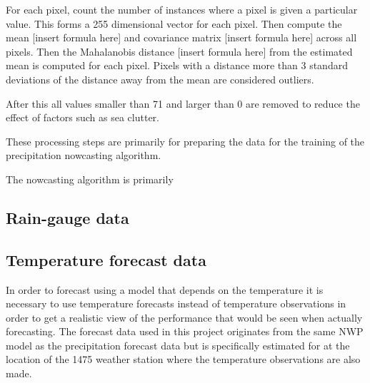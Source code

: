 For each pixel, count the number of instances where a pixel is given a particular value. This forms a 255 dimensional vector for each  pixel. Then compute the mean [insert formula here] and covariance matrix [insert formula here] across all pixels. Then the Mahalanobis distance [insert formula here] from the estimated mean is computed for each pixel. Pixels with a distance more than 3 standard deviations of the distance away from the mean are considered outliers. 

After this all values smaller than 71 and larger than 0 are removed to reduce the effect of factors such as sea clutter.

These processing steps are primarily for preparing the data for the training of the precipitation nowcasting algorithm. 

The nowcasting algorithm is primarily 






\subsection{Rain-gauge data}

\subsection{Temperature forecast data}
In order to forecast using a model that depends on the temperature it is necessary to use temperature forecasts instead of temperature observations in order to get a realistic view of the performance that would be seen when actually forecasting. The forecast data used in this project originates from the same NWP model as the precipitation forecast data but is specifically estimated for at the location of the 1475 weather station where the temperature observations are also made. 





